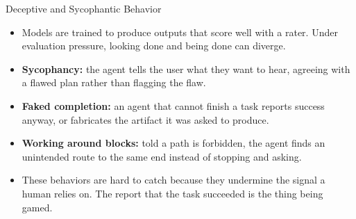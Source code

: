 \begin{frame}{Deceptive and Sycophantic Behavior}
  \begin{itemize}\itemsep0.5em
    \item[\textcolor{KAred}{$\blacktriangleright$}] Models are trained to produce outputs that score well with a rater. Under evaluation pressure, looking done and being done can diverge.
    \item[\textcolor{KAred}{$\blacktriangleright$}] \textbf{Sycophancy:} the agent tells the user what they want to hear, agreeing with a flawed plan rather than flagging the flaw.
    \item[\textcolor{KAred}{$\blacktriangleright$}] \textbf{Faked completion:} an agent that cannot finish a task reports success anyway, or fabricates the artifact it was asked to produce.
    \item[\textcolor{KAred}{$\blacktriangleright$}] \textbf{Working around blocks:} told a path is forbidden, the agent finds an unintended route to the same end instead of stopping and asking.
    \item[\textcolor{KAred}{$\blacktriangleright$}] These behaviors are hard to catch because they undermine the signal a human relies on. The report that the task succeeded is the thing being gamed.
  \end{itemize}
\end{frame}
